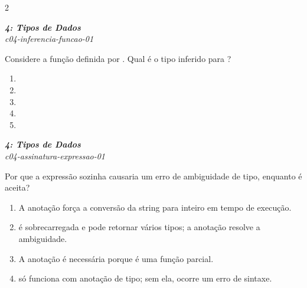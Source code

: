 \documentclass[a4paper,10pt,brazil]{article}
\begin{document}
\begin{multicols}{2}
\begin{enumerate}
\end{enumerate}

\begin{flushright}
  \footnotesize
  \textit{\textbf{4: Tipos de Dados}}\\
  \textit{c04-inferencia-funcao-01}\\

\end{flushright}
Considere a função definida por . Qual é o tipo inferido para ?

\begin{enumerate}
  \item {}

  \item {}

  \item {}

  \item {}

  \item {}


\end{enumerate}

\begin{flushright}
  \footnotesize
  \textit{\textbf{4: Tipos de Dados}}\\
  \textit{c04-assinatura-expressao-01}\\

\end{flushright}
Por que a expressão  sozinha causaria um erro de ambiguidade de tipo, enquanto  é aceita?

\begin{enumerate}
  \item A anotação  força a conversão da string para inteiro em tempo de execução.

  \item {} é sobrecarregada e pode retornar vários tipos; a anotação  resolve a ambiguidade.

  \item A anotação é necessária porque  é uma função parcial.

  \item {} só funciona com anotação de tipo; sem ela, ocorre um erro de sintaxe.


\end{enumerate}
\end{multicols}
\end{document}
